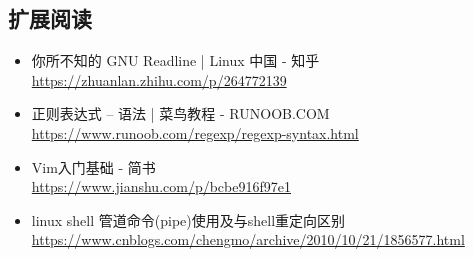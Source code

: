 \subsection*{扩展阅读}
\begin{itemize}
  \item 你所不知的 GNU Readline | Linux 中国 - 知乎\\
  \url{https://zhuanlan.zhihu.com/p/264772139}
  \item 正则表达式 – 语法 | 菜鸟教程 - RUNOOB.COM\\
  \url{https://www.runoob.com/regexp/regexp-syntax.html}
  \item Vim入门基础 - 简书\\
  \url{https://www.jianshu.com/p/bcbe916f97e1}
  \item linux shell 管道命令(pipe)使用及与shell重定向区别\\
  \url{https://www.cnblogs.com/chengmo/archive/2010/10/21/1856577.html}
\end{itemize}
\begin{lstlisting}[frame=none]

\end{lstlisting}
